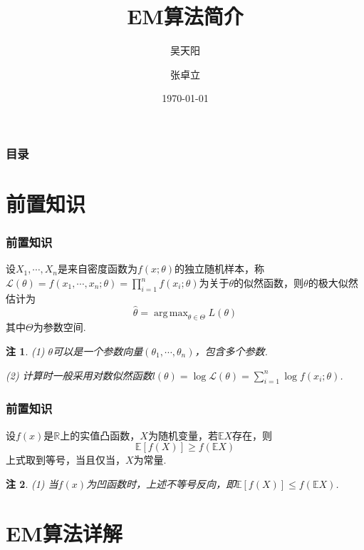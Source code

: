 \documentclass[UTF8]{ctexbeamer}
\title{EM算法简介}
\author{吴天阳\and 张卓立}
\institute{XJTU\and 强基数学}
\date{\today}  %
\DeclareMathOperator*{\argmax}{arg\,max}  %
\let\leq=\leqslant %
\let\geq=\geqslant %
\newtheorem{remark}{注}
\numberwithin{equation}{section}  %
\def\R{\mathbb{R}}          %
\def\E{\mathbb{E}}          %
\def\L{\mathcal{L}}         %
\begin{document}
\frame{\titlepage}  %

\begin{frame}
    \frametitle{目录}
    \tableofcontents
\end{frame}

\section{前置知识}
\begin{frame}
    \frametitle{前置知识}

    \begin{definition}[极大似然估计]
        设$X_1,\cdots,X_n$是来自密度函数为$f(x;\theta)$的独立随机样本，称$\L(\theta) = f(x_1,\cdots, x_n;\theta) = \prod_{i=1}^nf(x_i;\theta)$为关于$\theta$的\alert{似然函数}，则$\theta$的极大似然估计为
        \begin{equation*}
            \hat{\theta} = \argmax_{\theta\in \Theta} L(\theta)
        \end{equation*}
        其中$\Theta$为参数空间.
    \end{definition}\pause
    \begin{remark}
        (1) $\theta$可以是一个参数向量$(\theta_1,\cdots, \theta_n)$，包含多个参数.

        (2) 计算时一般采用\alert{对数似然函数}$l(\theta) = \log\L(\theta) = \sum_{i=1}^n\log f(x_i;\theta)$.
    \end{remark}
\end{frame}

\begin{frame}
    \frametitle{前置知识}

    \begin{theorem}[Jensen不等式]
        设$f(x)$是$\R$上的实值凸函数，$X$为随机变量，若$\E X$存在，则
        \begin{equation*}
            \E[f(X)]\geq f(\E X)
        \end{equation*}
        上式取到等号，当且仅当，$X$为常量.
    \end{theorem}\pause
    \begin{remark}
        (1) 当$f(x)$为凹函数时，上述不等号反向，即$\E[f(X)]\leq f(\E X)$.
    \end{remark}
\end{frame}

\section{EM算法详解}
\end{document}
